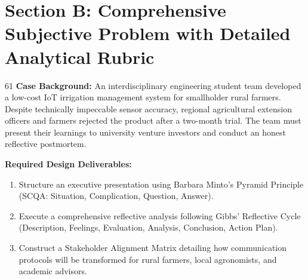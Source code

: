 \newpage
\section{Section B: Comprehensive Subjective Problem with Detailed Analytical Rubric}

\begin{subjectiveq}{6}{1}
\textbf{Case Background:} An interdisciplinary engineering student team developed a low-cost IoT irrigation management system for smallholder rural farmers. Despite technically impeccable sensor accuracy, regional agricultural extension officers and farmers rejected the product after a two-month trial. The team must present their learnings to university venture investors and conduct an honest reflective postmortem.

\textbf{Required Design Deliverables:}
\begin{enumerate}[label=(\alph*)]
    \item Structure an executive presentation using Barbara Minto's Pyramid Principle (SCQA: Situation, Complication, Question, Answer).
    \item Execute a comprehensive reflective analysis following Gibbs' Reflective Cycle (Description, Feelings, Evaluation, Analysis, Conclusion, Action Plan).
    \item Construct a Stakeholder Alignment Matrix detailing how communication protocols will be transformed for rural farmers, local agronomists, and academic advisors.
\end{enumerate}
\end{subjectiveq}

